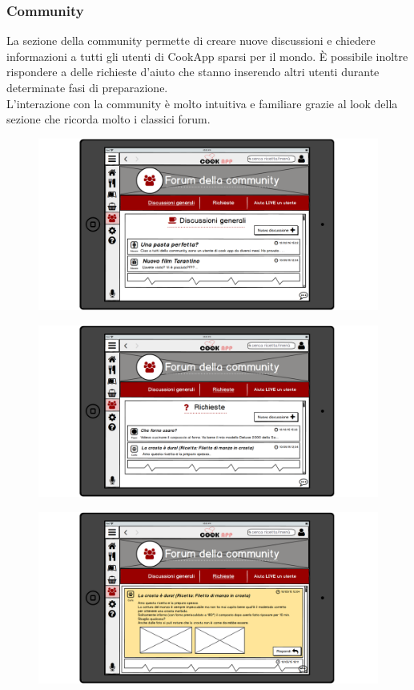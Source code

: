 \subsubsection{Community}
La sezione della community permette di creare nuove discussioni e
chiedere informazioni a tutti gli utenti di CookApp sparsi per il mondo.
È possibile inoltre rispondere a delle richieste d'aiuto che stanno
inserendo altri utenti durante determinate fasi di preparazione.\\
L'interazione con la community è molto intuitiva e familiare grazie al look della
sezione che ricorda molto i classici forum.
\begin{figure}[H]
	\centering
	\includegraphics[width=0.95\linewidth]{img/mockup/Community.png}
\end{figure}
\begin{figure}[H]
	\centering
	\includegraphics[width=0.95\linewidth]{img/mockup/Community2.png}
\end{figure}
\begin{figure}[H]
	\centering
	\includegraphics[width=0.95\linewidth]{img/mockup/Community3.png}
\end{figure}
